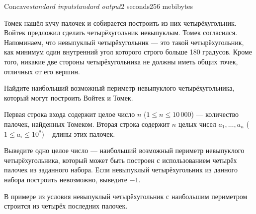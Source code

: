 \begin{problem}{Concave}{\textsl{standard input}}{\textsl{standard output}}{2 seconds}{256 mebibytes}

Томек нашёл кучу палочек и собирается построить из них четырёхугольник. Войтек предложил сделать четырёхугольник
невыпуклым. Томек согласился. Напоминаем, что невыпуклый четырёхугольник --- это такой четырёхугольник, как
минимум один внутренний угол которого строго больше 180 градусов. Кроме того, никакие две стороны четырёхугольника
не должны иметь общих точек, отличных от его вершин.

Найдите наибольший возможный периметр невыпуклого четырёхугольника, который могут построить Войтек и Томек.

\InputFile

Первая строка входа содержит целое число $n$ ($1 \leq n \leq 10\,000$) --- количество палочек, найденных Томеком.
Вторая строка содержит $n$ целых чисел $a_1, \ldots, a_n$ ($1 \leq a_i \leq 10^8$) -- длины этих палочек.

\OutputFile

Выведите одно целое число --- наибольший возможный периметр невыпуклого четырёхугольника, который может быть построен
с использованием четырёх палочек из заданного набора. Если невыпуклый четырёхугольник из данного набора построить
невозможно, выведите $-1$.

\Examples
\begin{example}
%
\end{example}

\Note
    
В примере из условия невыпуклый четырёхугольник с наибольшим периметром строится из четырёх последних палочек.

\end{problem}
